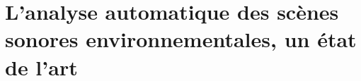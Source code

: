 \chapter{L'analyse automatique des scènes sonores environnementales, un état de l'art}\label{ch:ml_ea}






